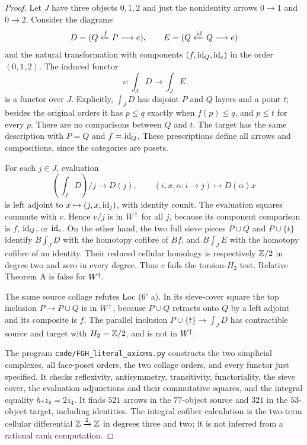 \begin{proof}
Let $J$ have three objects $0,1,2$ and just the nonidentity arrows $0\to1$ and $0\to2$. Consider the diagrams
\[
 D=(Q\xleftarrow{f}P\longrightarrow e),
 \qquad E=(Q\xleftarrow{\mathrm{id}}Q\longrightarrow e)
\]
and the natural transformation with components $(f,\mathrm{id}_Q,\mathrm{id}_e)$ in the order $(0,1,2)$. The induced functor
\[
 v:\int_J D\longrightarrow\int_J E
\]
is a functor over $J$. Explicitly, $\int_JD$ has disjoint $P$ and $Q$ layers and a point $t$; besides the original orders it has $p\leq q$ exactly when $f(p)\leq q$, and $p\leq t$ for every $p$. There are no comparisons between $Q$ and $t$. The target has the same description with $P=Q$ and $f=\mathrm{id}_Q$. These prescriptions define all arrows and compositions, since the categories are posets.

For each $j\in J$, evaluation
\[
 (\int_JD)/j\longrightarrow D(j),
 \qquad (i,x,\alpha:i\to j)\longmapsto D(\alpha)x
\]
is left adjoint to $x\mapsto(j,x,\mathrm{id}_j)$, with identity counit. The evaluation squares commute with $v$. Hence $v/j$ is in ${W^{\dagger}}$ for all $j$, because its component comparison is $f$, $\mathrm{id}_Q$, or $\mathrm{id}_e$. On the other hand, the two full sieve pieces $P\cup Q$ and $P\cup\{t\}$ identify $B\int_JD$ with the homotopy cofibre of $Bf$, and $B\int_JE$ with the homotopy cofibre of an identity. Their reduced cellular homology is respectively $\mathbb Z/2$ in degree two and zero in every degree. Thus $v$ fails the torsion-$H_2$ test. Relative Theorem A is false for ${W^{\dagger}}$.

The same source collage refutes Loc ($6'$ a). In its sieve-cover square the top inclusion $P\to P\cup Q$ is in ${W^{\dagger}}$, because $P\cup Q$ retracts onto $Q$ by a left adjoint and its composite is $f$. The parallel inclusion $P\cup\{t\}\to\int_JD$ has contractible source and target with $H_2=\mathbb Z/2$, and is not in ${W^{\dagger}}$.

The program \texttt{code/FGH\_literal\_axioms.py} constructs the two simplicial complexes, all face-poset orders, the two collage orders, and every functor just specified. It checks reflexivity, antisymmetry, transitivity, functoriality, the sieve cover, the evaluation adjunctions and their commutative squares, and the integral equality $h_*z_8=2z_4$. It finds $521$ arrows in the $77$-object source and $321$ in the $53$-object target, including identities. The integral cofiber calculation is the two-term cellular differential $\mathbb Z\xrightarrow{2}\mathbb Z$ in degrees three and two; it is not inferred from a rational rank computation.


\end{proof}
